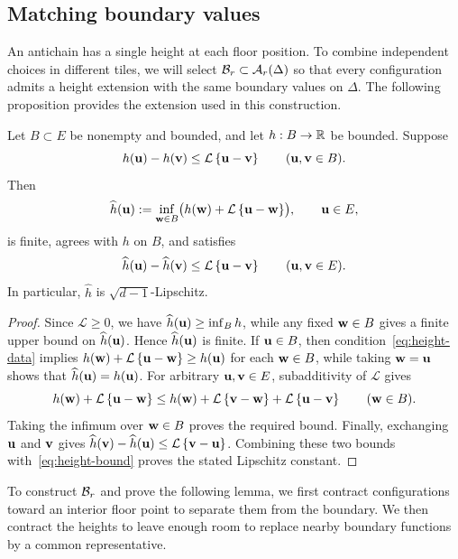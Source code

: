 \documentclass[11pt,letterpaper]{article}
\begin{document}
\subsection{Matching boundary values}

An antichain has a single height at each floor position. To combine independent choices in different tiles, we will select $\mathcal B_r\subset\mathcal A_r(\Delta)$ so that every configuration admits a height extension with the same boundary values on $\Delta$. The following proposition provides the extension used in this construction.

\begin{proposition}\label{prop:extension}
      Let $B\subset E$ be nonempty and bounded, and let $h:B\to\mathbb R$ be bounded. Suppose
      \begin{equation}\label{eq:height-data}
            h(\mathbf u)-h(\mathbf v)\le\mathcal L\left\{\mathbf u-\mathbf v\right\} \qquad(\mathbf u,\mathbf v\in B).
      \end{equation}
      Then
      \[
            \widehat h(\mathbf u):=\inf_{\mathbf w\in B} \bigl(h(\mathbf w)+\mathcal L\left\{\mathbf u-\mathbf w\right\}\bigr),\qquad \mathbf u\in E,
      \]
      is finite, agrees with $h$ on $B$, and satisfies
      \[
            \widehat h(\mathbf u)-\widehat h(\mathbf v)\le\mathcal L\left\{\mathbf u-\mathbf v\right\} \qquad(\mathbf u,\mathbf v\in E).
      \]
      In particular, $\widehat h$ is $\sqrt{d-1}$-Lipschitz.
\end{proposition}
\begin{proof}
      Since $\mathcal L\ge0$, we have $\widehat h(\mathbf u)\geq \inf_B h$, while any fixed $\mathbf w\in B$ gives a finite upper bound on $\widehat h(\mathbf u)$. Hence $\widehat h(\mathbf u)$ is finite. If $\mathbf u\in B$, then condition~\eqref{eq:height-data} implies $h(\mathbf w)+\mathcal L\left\{\mathbf u-\mathbf w\right\}\geq h(\mathbf u)$ for each $\mathbf w\in B$, while taking $\mathbf w=\mathbf u$ shows that $\widehat h(\mathbf u)=h(\mathbf u)$. For arbitrary $\mathbf u,\mathbf v\in E$, subadditivity of $\mathcal L$ gives
      \[
            h(\mathbf w)+\mathcal L\left\{\mathbf u-\mathbf w\right\} \le h(\mathbf w)+\mathcal L\left\{\mathbf v-\mathbf w\right\}+\mathcal L\left\{\mathbf u-\mathbf v\right\} \qquad(\mathbf w\in B).
      \]
      Taking the infimum over $\mathbf w\in B$ proves the required bound. Finally, exchanging $\mathbf u$ and $\mathbf v$ gives $\widehat h(\mathbf v)-\widehat h(\mathbf u)\le\mathcal L\left\{\mathbf v-\mathbf u\right\}$. Combining these two bounds with~\eqref{eq:height-bound} proves the stated Lipschitz constant.
\end{proof}

To construct $\mathcal B_r$ and prove the following lemma, we first contract configurations toward an interior floor point to separate them from the boundary. We then contract the heights to leave enough room to replace nearby boundary functions by a common representative.
\end{document}
